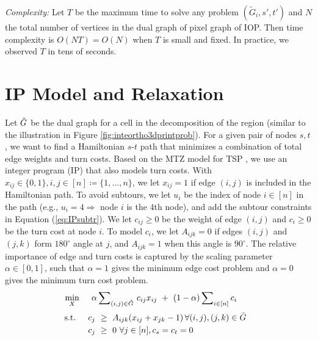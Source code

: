 \textit{Complexity:} Let $T$ be the maximum time to solve any problem $(\tilde{G}_i, s', t')$ and $N$ the total number of vertices in the dual graph of pixel graph of IOP.
Then time complexity is $O(NT) = O(N)$ when $T$ is small and fixed.
In practice, we observed $T$ in tens of seconds.
\section{IP Model and Relaxation}\label{sec:ipmodel}
Let $\tilde{G}$ be the dual graph for a cell in the decomposition of the region (similar to the illustration in Figure \ref{fig:inteortho3dprintprob}).
For a given pair of nodes $s,t$, we want to find a Hamiltonian $s$-$t$ path that minimizes a combination of total edge weights and turn costs.
Based on the MTZ model for TSP \cite{MiTuZe1960}, we use an integer program (IP) that also models turn costs.
With $x_{ij} \in \{0,1\}, i,j \in [n] \coloneq \{1,\dots,n\}$, we let $x_{ij}=1$ if edge $(i,j)$ is included in the Hamiltonian path.
To avoid subtours, we let $u_i$ be the index of node $i \in [n]$ in the path (e.g., $u_i=4 \Rightarrow$ node $i$ is the $4$th node), and add the subtour constraints in Equation (\ref{eq:IPsubtr}).
We let $c_{ij} \geq 0$ be the weight of edge $(i,j)$ and $c_i \geq 0$ be the turn cost at node $i$.
To model $c_i$, we let $A_{ijk} = 0$  if edges $(i,j)$ and $(j,k)$ form $180^\circ$ angle at $j$, and $A_{ijk}=1$ when this angle is $90^\circ$.
The relative importance of edge and turn costs is captured by the scaling parameter $\alpha \in [0, 1]$, such that $\alpha=1$ gives the minimum edge cost problem and $\alpha=0$ gives the minimum turn cost problem.
\begin{equation} \label{eq:IPobj}
  \begin{aligned}
    \min_{X} \hspace*{0.2in} & \alpha \sum\nolimits_{(i,j) \in \tilde{G}} \, c_{ij} x_{ij} ~+~ (1-\alpha) \sum\nolimits_{i \in [n]} c_i \hspace*{0.1in}  
  \end{aligned}
\end{equation}
\vspace*{-0.1in}
\begin{equation} \label{eq:IPturncost}
  \begin{aligned}
    \mbox{s.t.} \hspace*{0.2in} & c_j ~\geq~A_{ijk}(x_{ij}+x_{jk}-1) \, \forall (i,j), (j,k) \in \tilde{G}  \hspace*{0.1in}\\
                & c_j ~\geq~0~ \forall j \in [n], c_s = c_t = 0
  \end{aligned}
\end{equation}
